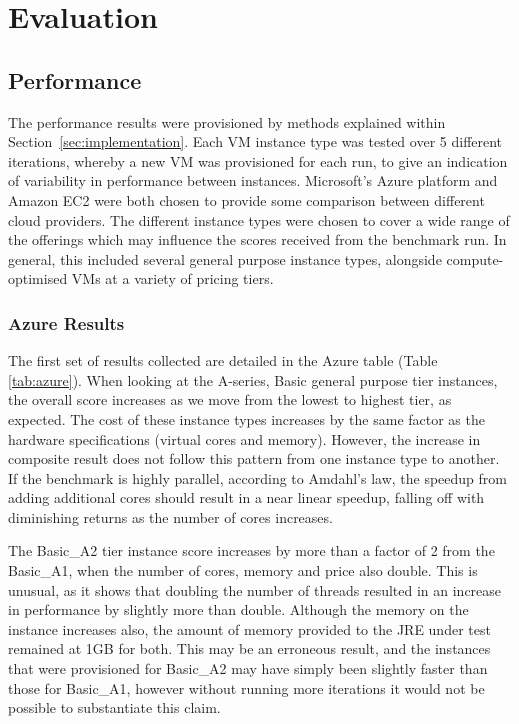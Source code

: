 \documentclass{llncs}
\begin{document}

\section{Evaluation}

\subsection{Performance}\label{sec:eval:performance}

The performance results were provisioned by methods explained within Section~\ref{sec:implementation}. Each VM instance type was tested over 5 different iterations, whereby a new VM was provisioned for each run, to give an indication of variability in performance between instances. Microsoft's Azure platform and Amazon EC2 were both chosen to provide some comparison between different cloud providers. The different instance types were chosen to cover a wide range of the offerings which may influence the scores received from the benchmark run. In general, this included several general purpose instance types, alongside compute-optimised VMs at a variety of pricing tiers.

\subsubsection{Azure Results}\label{sec:eval:azureresults}

The first set of results collected are detailed in the Azure table (Table \ref{tab:azure}). When looking at the A-series, Basic general purpose tier instances, the overall score increases as we move from the lowest to highest tier, as expected. The cost of these instance types increases by the same factor as the hardware specifications (virtual cores and memory). However, the increase in composite result does not follow this pattern from one instance type to another. If the benchmark is highly parallel, according to Amdahl's law, the speedup from adding additional cores should result in a near linear speedup, falling off with diminishing returns as the number of cores increases.

The Basic\_A2 tier instance score increases by more than a factor of 2 from the Basic\_A1, when the number of cores, memory and price also double. This is unusual, as it shows that doubling the number of threads resulted in an increase in performance by slightly more than double. Although the memory on the instance increases also, the amount of memory provided to the JRE under test remained at 1GB for both. This may be an erroneous result, and the instances that were provisioned for Basic\_A2 may have simply been slightly faster than those for Basic\_A1, however without running more iterations it would not be possible to substantiate this claim.
\end{document}
